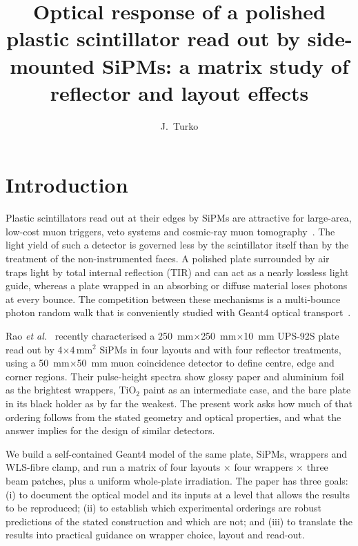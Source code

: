 \documentclass[preprint,12pt]{elsarticle}
\author{J.~Turko}
\title{Optical response of a polished plastic scintillator read out by
side-mounted SiPMs: a \gfour{} matrix study of reflector and layout effects}
\newcommand{\gfour}{Geant4}
\begin{document}
\begin{frontmatter}


\end{frontmatter}

\section{Introduction}
\label{sec:intro}

Plastic scintillators read out at their edges by SiPMs are attractive for
large-area, low-cost muon triggers, veto systems and cosmic-ray muon
tomography~\cite{Borozdin2003,Bonechi2020}. The light yield of such a detector
is governed less by the scintillator itself than by the treatment of the
non-instrumented faces. A polished plate surrounded by air traps light by total
internal reflection (TIR) and can act as a nearly lossless light guide, whereas
a plate wrapped in an absorbing or diffuse material loses photons at every
bounce. The competition between these mechanisms is a multi-bounce photon
random walk that is conveniently studied with \gfour{} optical
transport~\cite{Agostinelli2003,Allison2016,Korpachev2017}.

Rao \emph{et al.}~\cite{Rao2025} recently characterised a
\SI{250}{\milli\meter}$\times$\SI{250}{\milli\meter}$\times$\SI{10}{\milli\meter}
UPS-92S plate read out by 4$\times$4\,mm$^2$ SiPMs in four layouts and with four
reflector treatments, using a \SI{50}{\milli\meter}$\times$\SI{50}{\milli\meter}
muon coincidence detector to define centre, edge and corner regions. Their
pulse-height spectra show glossy paper and aluminium foil as the brightest
wrappers, TiO$_2$ paint as an intermediate case, and the bare plate in its black
holder as by far the weakest. The present work asks how much of that ordering
follows from the stated geometry and optical properties, and what the answer
implies for the design of similar detectors.

We build a self-contained \gfour{} model of the same plate, SiPMs, wrappers and
WLS-fibre clamp, and run a matrix of four layouts $\times$ four wrappers
$\times$ three beam patches, plus a uniform whole-plate irradiation. The paper
has three goals: (i) to document the optical model and its inputs at a level
that allows the results to be reproduced; (ii) to establish which experimental
orderings are robust predictions of the stated construction and which are not;
and (iii) to translate the results into practical guidance on wrapper choice,
layout and read-out.
\end{document}
